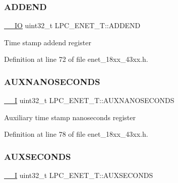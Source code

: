 \subsubsection{\texorpdfstring{A\+D\+D\+E\+ND}{ADDEND}}
{\footnotesize\ttfamily \hyperlink{core__sc300_8h_aec43007d9998a0a0e01faede4133d6be}{\+\_\+\+\_\+\+IO} uint32\+\_\+t L\+P\+C\+\_\+\+E\+N\+E\+T\+\_\+\+T\+::\+A\+D\+D\+E\+ND}

Time stamp addend register 

Definition at line 72 of file enet\+\_\+18xx\+\_\+43xx.\+h.

\mbox{\label{struct_l_p_c___e_n_e_t___t_af8c9c3c59f01af31ae421be71126105d}} 
\subsubsection{\texorpdfstring{A\+U\+X\+N\+A\+N\+O\+S\+E\+C\+O\+N\+DS}{AUXNANOSECONDS}}
{\footnotesize\ttfamily \hyperlink{core__sc300_8h_af63697ed9952cc71e1225efe205f6cd3}{\+\_\+\+\_\+I} uint32\+\_\+t L\+P\+C\+\_\+\+E\+N\+E\+T\+\_\+\+T\+::\+A\+U\+X\+N\+A\+N\+O\+S\+E\+C\+O\+N\+DS}

Auxiliary time stamp nanoseconds register 

Definition at line 78 of file enet\+\_\+18xx\+\_\+43xx.\+h.

\mbox{\label{struct_l_p_c___e_n_e_t___t_ad3998715b672d2823dd6a0fb84635b42}} 
\subsubsection{\texorpdfstring{A\+U\+X\+S\+E\+C\+O\+N\+DS}{AUXSECONDS}}
{\footnotesize\ttfamily \hyperlink{core__sc300_8h_af63697ed9952cc71e1225efe205f6cd3}{\+\_\+\+\_\+I} uint32\+\_\+t L\+P\+C\+\_\+\+E\+N\+E\+T\+\_\+\+T\+::\+A\+U\+X\+S\+E\+C\+O\+N\+DS}

